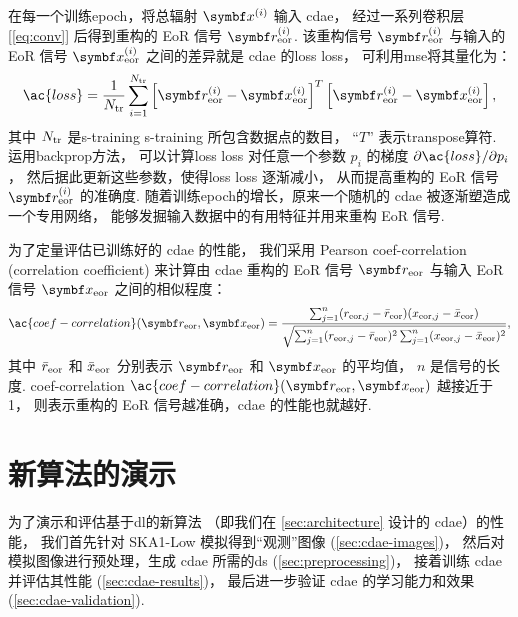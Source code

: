 在每一个训练\ac{epoch}，将总辐射 $\B{x}^{(i)}$ 输入 \ac{cdae}，
经过一系列卷积层 [\autoref{eq:conv}]
后得到重构的 EoR 信号 $\B{r}^{(i)}_{\R{eor}}$.
该重构信号 $\B{r}^{(i)}_{\R{eor}}$ 与输入的 EoR 信号 $\B{x}^{(i)}_{\R{eor}}$
之间的差异就是 \ac{cdae} 的\acl{loss} \ac{loss}，
可利用\ac{mse}将其量化为：
\begin{equation}
  \label{eq:loss}
  \ac{loss} = \frac{1}{N_{\R{tr}}} \sum_{i=1}^{N_{\R{tr}}}
    \left[ \B{r}_{\R{eor}}^{(i)} - \B{x}_{\R{eor}}^{(i)} \right]^T
    \left[ \B{r}_{\R{eor}}^{(i)} - \B{x}_{\R{eor}}^{(i)} \right] ,
\end{equation}
其中 $N_{\mathrm{tr}}$ 是\acl{s-training} \ac{s-training} 所包含数据点的数目，
\enquote{$T$} 表示\ac{transpose}算符.
运用\ac{backprop}方法\cite{rumelhart1986,leCun1998bp}，
可以计算\acl{loss} \ac{loss} 对任意一个参数 $p_i$ 的梯度
$\partial \ac{loss} / \partial p_i$，
然后据此更新这些参数，使得\acl{loss} \ac{loss} 逐渐减小，
从而提高重构的 EoR 信号 $\B{r}^{(i)}_{\R{eor}}$ 的准确度.
随着训练\ac{epoch}的增长，原来一个随机的 \ac{cdae} 被逐渐塑造成一个专用网络，
能够发掘输入数据中的有用特征并用来重构 EoR 信号.

为了定量评估已训练好的 \ac{cdae} 的性能，
我们采用 Pearson \acl{coef-correlation} (correlation coefficient)
\cite{harker2009,chapman2013}
来计算由 \ac{cdae} 重构的 EoR 信号 $\B{r}_{\R{eor}}$ 与输入 EoR 信号
$\B{x}_{\R{eor}}$ 之间的相似程度：
\begin{equation}
  \label{eq:corrcoef}
  \ac{coef-correlation}(\B{r}_{\R{eor}}, \B{x}_{\R{eor}})
      = \frac{\sum_{j=1}^{n}(r_{\R{eor},j} - \bar{r}_{\R{eor}})
            (x_{\R{eor},j} - \bar{x}_{\R{eor}})}{
          \sqrt{\sum_{j=1}^{n}(r_{\R{eor},j} - \bar{r}_{\R{eor}})^2
            \sum_{j=1}^{n}(x_{\R{eor},j} - \bar{x}_{\R{eor}})^2}
        } ,
\end{equation}
其中
$\bar{r}_{\mathrm{eor}}$ 和 $\bar{x}_{\mathrm{eor}}$ 分别表示
$\B{r}_{\R{eor}}$ 和 $\B{x}_{\R{eor}}$ 的平均值，
$n$ 是信号的长度.
\acl{coef-correlation}
$\ac{coef-correlation}(\B{r}_{\R{eor}}, \B{x}_{\R{eor}})$ 越接近于 1，
则表示重构的 EoR 信号越准确，\ac{cdae} 的性能也就越好.


\section{新算法的演示}
\label{sec:cdae-demo}

为了演示和评估基于\ac{dl}的新算法
（即我们在 \autoref{sec:architecture} 设计的 \ac{cdae}）的性能，
我们首先针对 SKA1-Low 模拟得到\enquote{观测}图像 (\autoref{sec:cdae-images})，
然后对模拟图像进行预处理，生成 \ac{cdae} 所需的\ac{ds} (\autoref{sec:preprocessing})，
接着训练 \ac{cdae} 并评估其性能 (\autoref{sec:cdae-results})，
最后进一步验证 \ac{cdae} 的学习能力和效果 (\autoref{sec:cdae-validation}).

